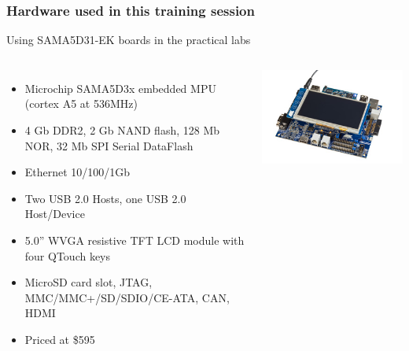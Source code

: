 \begin{frame}
\frametitle{Hardware used in this training session}
  Using SAMA5D31-EK boards in the practical labs
  \begin{columns}
    \begin{itemize}
      \item Microchip SAMA5D3x embedded MPU (cortex A5 at 536MHz)
      \item 4 Gb DDR2, 2 Gb NAND flash, 128 Mb NOR, 32 Mb SPI Serial DataFlash
      \item Ethernet 10/100/1Gb
      \item Two USB 2.0 Hosts, one USB 2.0 Host/Device
      \item 5.0” WVGA resistive TFT LCD module with four QTouch keys
      \item MicroSD card slot, JTAG, MMC/MMC+/SD/SDIO/CE-ATA, CAN, HDMI
      \item Priced at \$595
    \end{itemize}
    \includegraphics[width=\textwidth]{slides/sama5d3-board/sama5d31ek.jpg}
  \end{columns}
\end{frame}
